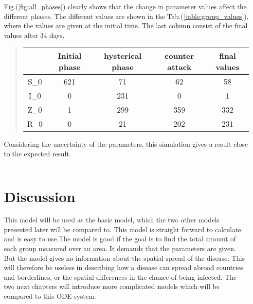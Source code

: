 \documentclass[%
twoside,                 %
final,                   %
chapterprefix=true,      %
open=right               %
10pt]{book}
\begin{document}
Fig.(\ref{fig:all_phases}) clearly shows that the change in parameter values affect the different phases. The different values are shown in the Tab.(\ref{table:group_values}), where the values are given at the initial time. The last column consist of the final values after 34 days.

\label{table:group_values}

\begin{quote}
\begin{tabular}{ccccc}
\hline
\multicolumn{1}{c}{  } & \multicolumn{1}{c}{ Initial phase } & \multicolumn{1}{c}{ hysterical phase } & \multicolumn{1}{c}{ counter attack } & \multicolumn{1}{c}{ final values } \\
\hline
S_0              & 621              & 71               & 62               & 58               \\
I_0              & 0                & 231              & 0                & 1                \\
Z_0              & 1                & 299              & 359              & 332              \\
R_0              & 0                & 21               & 202              & 231              \\
\hline
\end{tabular}
\end{quote}

\noindent
Considering the uncertainty of the parameters, this simulation gives a result close to the expected result. 
\\
\\
\section{Discussion}
This model will be used as the basic model, which the two other models presented later will be compared to. This model is straight forward to calculate and is easy to use.The model is good if the goal is to find the total amount of each group measured over an area. It demands that the parameters are given. But the model gives no information about the spatial spread of the disease. This will therefore be useless in describing how a disease can spread abroad countries and borderlines, or the spatial differences in the chance of being infected. The two next chapters will introduce more complicated models which will be compared to this ODE-system. 
\end{document}
